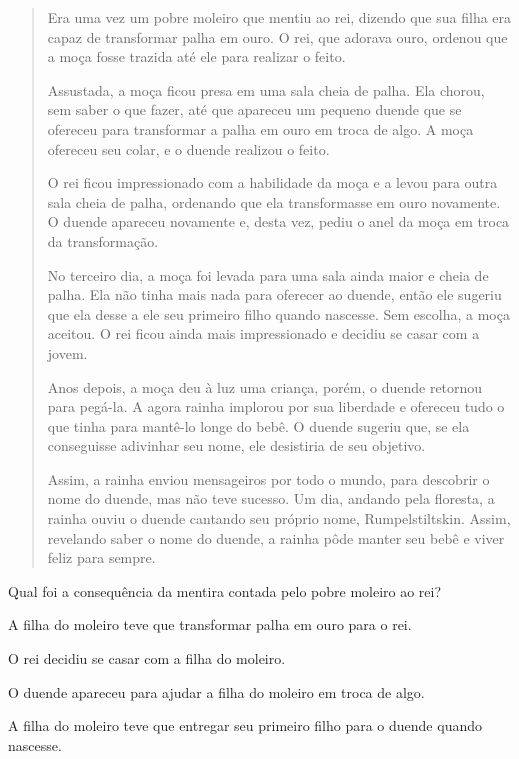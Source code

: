 \begin{quote}
Era uma vez um pobre moleiro que mentiu ao rei, dizendo que sua filha
era capaz de transformar palha em ouro. O rei, que adorava ouro, ordenou
que a moça fosse trazida até ele para realizar o feito.

Assustada, a moça ficou presa em uma sala cheia de palha. Ela chorou,
sem saber o que fazer, até que apareceu um pequeno duende que se
ofereceu para transformar a palha em ouro em troca de algo. A moça
ofereceu seu colar, e o duende realizou o feito.

O rei ficou impressionado com a habilidade da moça e a levou para outra
sala cheia de palha, ordenando que ela transformasse em ouro novamente.
O duende apareceu novamente e, desta vez, pediu o anel da moça em troca
da transformação.

No terceiro dia, a moça foi levada para uma sala ainda maior e cheia de
palha. Ela não tinha mais nada para oferecer ao duende, então ele
sugeriu que ela desse a ele seu primeiro filho quando nascesse. Sem
escolha, a moça aceitou. O rei ficou ainda mais impressionado e decidiu
se casar com a jovem.

Anos depois, a moça deu à luz uma criança, porém, o duende retornou para
pegá-la. A agora rainha implorou por sua liberdade e ofereceu tudo o que
tinha para mantê-lo longe do bebê. O duende sugeriu que, se ela
conseguisse adivinhar seu nome, ele desistiria de seu objetivo.

Assim, a rainha enviou mensageiros por todo o mundo, para descobrir o
nome do duende, mas não teve sucesso. Um dia, andando pela floresta, a
rainha ouviu o duende cantando seu próprio nome, Rumpelstiltskin. Assim,
revelando saber o nome do duende, a rainha pôde manter seu bebê e viver
feliz para sempre.
\end{quote}

Qual foi a consequência da mentira contada pelo pobre moleiro ao rei?

\begin{escolha}
\item A filha do moleiro teve que transformar palha em ouro para o rei.

\item O rei decidiu se casar com a filha do moleiro.

\item O duende apareceu para ajudar a filha do moleiro em troca de algo.

\item A filha do moleiro teve que entregar seu primeiro filho para o duende quando nascesse.
\end{escolha}

